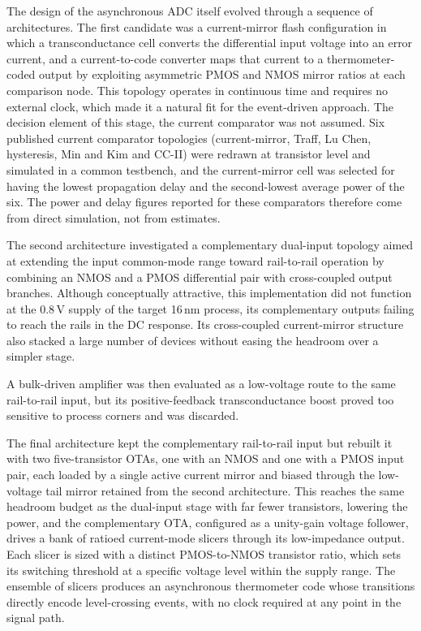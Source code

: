 The design of the asynchronous ADC itself evolved through a sequence of architectures.
The first candidate was a current-mirror flash configuration in which a transconductance cell
converts the differential input voltage into an error current, and a current-to-code converter maps
that current to a thermometer-coded output by exploiting asymmetric PMOS and NMOS mirror
ratios at each comparison node. This topology operates in continuous time and requires no
external clock, which made it a natural fit for the event-driven approach. The decision element of
this stage, the current comparator was not assumed. Six published current comparator topologies
(current-mirror, Traff, Lu Chen, hysteresis, Min and Kim and CC-II) were redrawn at transistor
level and simulated in a common testbench, and the current-mirror cell was selected for having the
lowest propagation delay and the second-lowest average power of the six. The power and delay
figures reported for these comparators therefore come from direct simulation, not from estimates. 

The second architecture
investigated a complementary dual-input topology aimed at extending the input common-mode
range toward rail-to-rail operation by combining an NMOS and a PMOS differential pair with
cross-coupled output branches. Although conceptually attractive, this implementation did not function
at the 0.8\,V supply of the target 16\,nm process, its complementary outputs failing to reach the
rails in the DC response. Its cross-coupled current-mirror structure also stacked a large number of
devices without easing the headroom over a simpler stage. 

A bulk-driven amplifier was then evaluated as a
low-voltage route to the same rail-to-rail input, but its positive-feedback transconductance boost
proved too sensitive to process corners and was discarded. 

The final architecture kept the
complementary rail-to-rail input but rebuilt it with two five-transistor OTAs, one with an NMOS
and one with a PMOS input pair, each loaded by a single active current mirror and biased through
the low-voltage tail mirror retained from the second architecture. This reaches the same headroom
budget as the dual-input stage with far fewer transistors, lowering the power, and the complementary
OTA, configured as a unity-gain
voltage follower, drives a bank of ratioed current-mode slicers through its low-impedance output. Each
slicer is sized with a distinct PMOS-to-NMOS transistor ratio, which sets its switching threshold
at a specific voltage level within the supply range. The ensemble of slicers produces an
asynchronous thermometer code whose transitions directly encode level-crossing events, with no
clock required at any point in the signal path.


